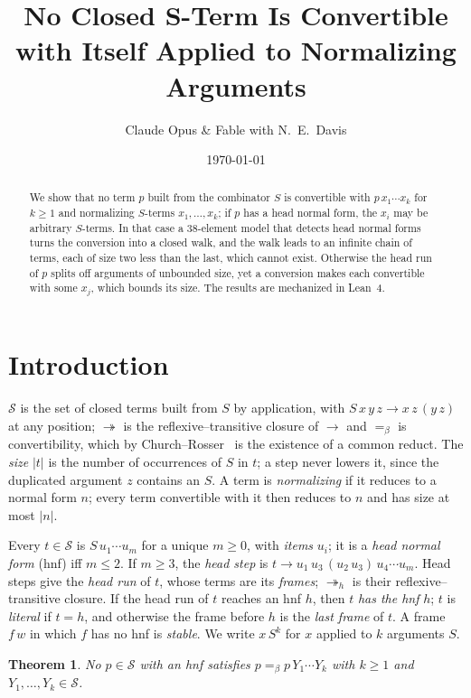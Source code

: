 \documentclass[11pt]{amsart}
\title[$S$-Terms Absorb No Normalizing Arguments]{No Closed $\bm{S}$-Term Is Convertible with Itself Applied to Normalizing Arguments}
\author{Claude Opus \& Fable with N.\ E.\ Davis}
\date{\today}
\newtheorem{theorem}{Theorem}
\newcommand{\Ter}{\mathcal S}
\newcommand{\red}{\twoheadrightarrow}
\newcommand{\hred}{\twoheadrightarrow_h}
\newcommand{\conv}{=_\beta}
\newcommand{\sz}[1]{\lvert#1\rvert}
\begin{document}
\begin{abstract}
We show that no term $p$ built from the combinator $S$ is convertible with $p\,x_1\cdots x_k$
for $k\ge1$ and normalizing $S$-terms $x_1,\dots,x_k$; if $p$ has a head normal form, the $x_i$
may be arbitrary $S$-terms. In that case a 38-element model that detects head normal forms turns
the conversion into a closed walk, and the walk leads to an infinite chain of terms, each of size
two less than the last, which cannot exist. Otherwise the head run of $p$ splits off arguments of
unbounded size, yet a conversion makes each convertible with some $x_j$, which bounds its size.
The results are mechanized in Lean~4.
\end{abstract}

\maketitle

\section{Introduction}

$\Ter$ is the set of closed terms built from $S$ by application, with $S\,x\,y\,z\to x\,z\,(y\,z)$ at
any position; $\red$ is the reflexive--transitive closure of $\to$ and $\conv$ is convertibility,
which by Church--Rosser~\citep{terese} is the existence of a common reduct. The \emph{size}
$\sz t$ is the number of occurrences of $S$ in $t$; a step never lowers it, since the duplicated argument $z$ contains an $S$. A term is \emph{normalizing} if it reduces to a normal form $n$; every term convertible with
it then reduces to $n$ and has size at most $\sz n$.

Every $t\in\Ter$ is $S\,u_1\cdots u_m$ for a unique $m\ge0$, with \emph{items} $u_i$; it is a
\emph{head normal form} (hnf) iff $m\le2$. If $m\ge3$, the \emph{head step} is
$t\to u_1\,u_3\,(u_2\,u_3)\,u_4\cdots u_m$. Head steps give the \emph{head run} of $t$, whose terms
are its \emph{frames}; $\hred$ is their reflexive--transitive closure. If the head run of $t$
reaches an hnf $h$, then $t$ \emph{has the hnf} $h$; $t$ is \emph{literal} if $t=h$, and otherwise
the frame before $h$ is the \emph{last frame} of $t$. A frame $f\,w$ in which $f$ has no hnf is
\emph{stable}. We write $x\,S^k$ for $x$ applied to $k$ arguments $S$.

\begin{theorem}\label{thm:main}
No $p\in\Ter$ with an hnf satisfies $p\conv p\,Y_1\cdots Y_k$ with $k\ge1$ and
$Y_1,\dots,Y_k\in\Ter$.
\end{theorem}
\end{document}
